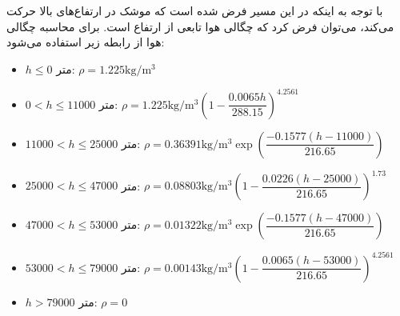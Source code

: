 با توجه به اینکه در این مسیر فرض شده است که موشک در ارتفاع‌های بالا حرکت می‌کند، می‌توان فرض کرد که چگالی هوا تابعی از ارتفاع است. برای محاسبه چگالی هوا از رابطه زیر استفاده می‌شود:
\begin{itemize}
    \item $h \leq 0$ متر: $\rho = 1.225 \mathrm{kg/m^3}$
    \item $0 < h \leq 11000$ متر: $\rho = 1.225 \mathrm{kg/m^3} \left(1 - \dfrac{0.0065h}{288.15}\right)^{4.2561}$
    \item $11000 < h \leq 25000$ متر: $\rho = 0.36391 \mathrm{kg/m^3} \exp\left(\dfrac{-0.1577(h-11000)}{216.65}\right)$
    \item $25000 < h \leq 47000$ متر: $\rho = 0.08803 \mathrm{kg/m^3} \left(1 - \dfrac{0.0226(h-25000)}{216.65}\right)^{1.73}$
    \item $47000 < h \leq 53000$ متر: $\rho = 0.01322 \mathrm{kg/m^3} \exp\left(\dfrac{-0.1577(h-47000)}{216.65}\right)$
    \item $53000 < h \leq 79000$ متر: $\rho = 0.00143 \mathrm{kg/m^3} \left(1 - \dfrac{0.0065(h-53000)}{216.65}\right)^{4.2561}$
    \item $h > 79000$ متر: $\rho = 0$
\end{itemize}

